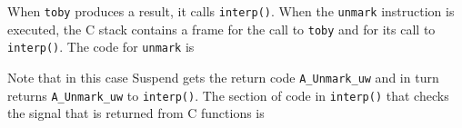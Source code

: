 When \texttt{toby} produces a result, it calls \texttt{interp()}. When
the \texttt{unmark} instruction is executed, the C stack contains a
frame for the call to \texttt{toby} and for its call to
\texttt{interp()}. The code for \texttt{unmark} is

\goodbreak
{}


Note that in this case Suspend gets the return code
\texttt{A\_Unmark\_uw} and in turn returns \texttt{A\_Unmark\_uw} to
\texttt{interp()}. The section of code in \texttt{interp()} that
checks the signal that is returned from C functions is

